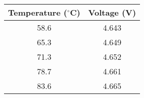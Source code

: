    \begin{tabular}{|c|c|} 
        \hline
        \textbf{Temperature ($^{\circ}$C)} & \textbf{Voltage (V)} \\
        \hline
        58.6 & 4.643 \\
        \hline
        65.3 & 4.649 \\
        \hline
        71.3 & 4.652 \\
        \hline
        78.7 & 4.661 \\
        \hline
        83.6 & 4.665 \\
        \hline
    \end{tabular}
